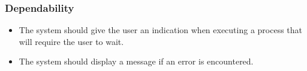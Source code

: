     \subsubsection{\textbf{Dependability}}
        \begin{itemize}
            \item The system should give the user an indication when executing a process that will require the user to wait.
            \item The system should display a message if an error is encountered.
        \end{itemize}
